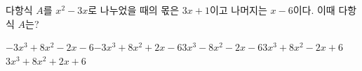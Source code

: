 다항식 $A$를 $x^2-3x$로 나누었을 때의 몫은 $3x+1$이고 나머지는 $x-6$이다. 이때 다항식 $A$는?
\begin{choicesii}{$-3x^3+8x^2-2x-6$}{$-3x^3+8x^2+2x-6$}{$3x^3-8x^2-2x-6$}{$3x^3+8x^2-2x+6$}{$3x^3+8x^2+2x+6$}\end{choicesii}
